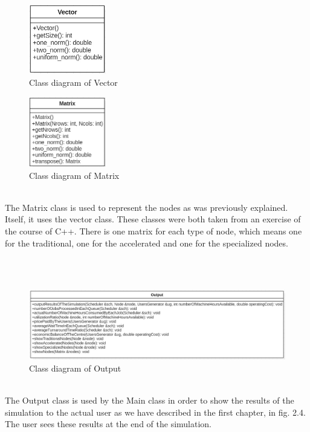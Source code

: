 \documentclass [10 pt, a4 paper]{report}
\begin{document}
\begin{figure}[!htbp]
\centering
\includegraphics[width=0.3\textwidth]{Vector.jpg}
\caption{\label{fig:image} Class diagram of Vector}
\end{figure}

\begin{figure}[!htbp]
\centering
\includegraphics[width=0.3\textwidth]{Matrix.jpg}
\caption{\label{fig:image} Class diagram of Matrix}
\end{figure}
\\

\noindent
The Matrix class is used to represent the nodes as was previously explained. Itself, it uses the vector class. These classes were both taken from an exercise of the course of C++. There is one matrix for each type of node, which means one for the traditional, one for the accelerated and one for the specialized nodes.


\\ \\

\begin{figure}[!htbp]
\centering
\includegraphics[width=1.3\textwidth]{Output.jpg}
\caption{\label{fig:image} Class diagram of Output}
\end{figure}
\\

\noindent
The Output class is used by the Main class in order to show the results of the simulation to the actual user as we have described in the first chapter, in fig. 2.4. The user sees these results at the end of the simulation.
\end{document}
